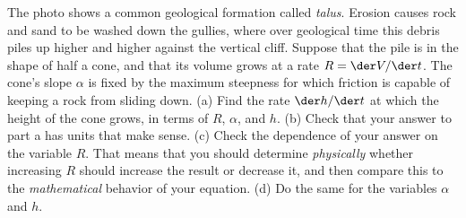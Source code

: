 The photo shows a common geological formation called \emph{talus}. Erosion causes
rock and sand to be washed down the gullies, where  over geological time
this debris piles up higher and higher
against the vertical cliff.
Suppose that the pile is
in the shape of half a cone, and that its volume grows at a
rate $R=\der V/\der t$.
The cone's slope $\alpha$ is fixed by the maximum steepness
for which friction is capable of keeping a rock from sliding down.
(a) Find the rate $\der h/\der t$ at which the height of the cone
grows, in terms of $R$, $\alpha$, and $h$.
(b) Check that your answer to part a has units that make sense.
(c) Check the dependence of your answer on the variable $R$.
That means that you should determine \emph{physically} whether increasing $R$ should increase
the result or decrease it, and then compare this to the \emph{mathematical}
behavior of your equation.
(d) Do the same for the variables $\alpha$ and $h$.\answercheck
